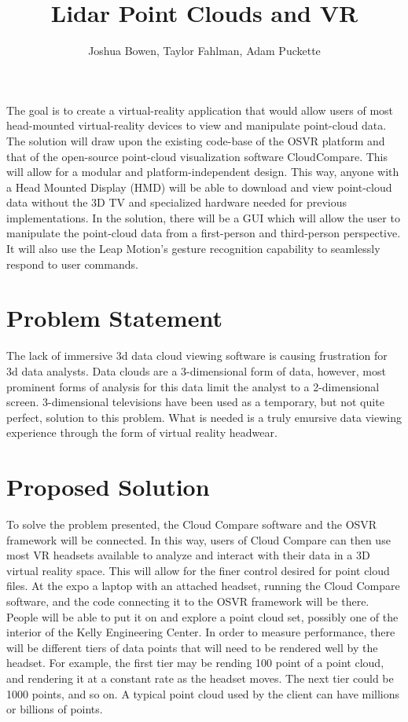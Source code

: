 \documentclass{article}
\begin{document}
\title{Lidar Point Clouds and VR}
\author{Joshua Bowen, Taylor Fahlman, Adam Puckette}

\maketitle

\abstract

The goal is to create a virtual-reality application that would allow users of most head-mounted virtual-reality devices to view and manipulate point-cloud data. The solution will draw upon the existing code-base of the OSVR platform and that of the open-source point-cloud visualization software CloudCompare. This will allow for a modular and platform-independent design. This way, anyone with a Head Mounted Display (HMD) will be able to download and view point-cloud data without the 3D TV and specialized hardware needed for previous implementations. In the solution, there will be a GUI which will allow the user to manipulate the point-cloud data from a first-person and third-person perspective. It will also use the Leap Motion's gesture recognition capability to seamlessly respond to user commands.


\section*{Problem Statement}

The lack of immersive 3d data cloud viewing software is causing frustration for 3d data analysts. Data clouds are a 3-dimensional form of data, however, most prominent forms of analysis for this data limit the analyst to a 2-dimensional screen. 3-dimensional televisions have been used as a temporary, but not quite perfect, solution to this problem. What is needed is a truly emursive data viewing experience through the form of virtual reality headwear.

\section*{Proposed Solution}

To solve the problem presented, the Cloud Compare software and the OSVR framework will be connected. In this way, users of Cloud Compare can then use most VR headsets available to analyze and interact with their data in a 3D virtual reality space. This will allow for the finer control desired for point cloud files. At the expo a laptop with an attached headset, running the Cloud Compare software, and the code connecting it to the OSVR framework will be there. People will be able to put it on and explore a point cloud set, possibly one of the interior of the Kelly Engineering Center. In order to measure performance, there will be different tiers of data points that will need to be rendered well by the headset. For example, the first tier may be rending 100 point of a point cloud, and rendering it at a constant rate as the headset moves. The next tier could be 1000 points, and so on. A typical point cloud used by the client can have millions or billions of points. 
\end{document}
